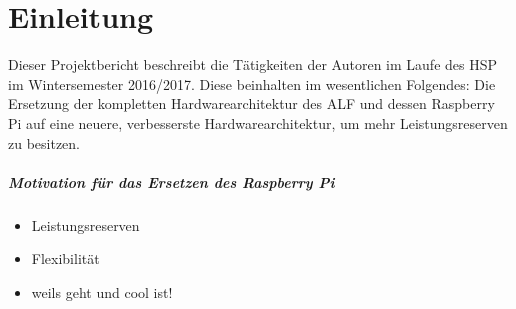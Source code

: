 \chapter{Einleitung}
Dieser Projektbericht beschreibt die Tätigkeiten der Autoren im Laufe des 
\ac{HSP} im Wintersemester 2016/2017. Diese beinhalten im wesentlichen 
Folgendes:
Die Ersetzung der kompletten Hardwarearchitektur des ALF und dessen Raspberry Pi 
auf eine neuere, verbesserste Hardwarearchitektur, um mehr Leistungsreserven zu 
besitzen.

\paragraph{Motivation für das Ersetzen des Raspberry Pi} 
\begin{itemize}
 \item Leistungsreserven
 \item Flexibilität
 \item weils geht und cool ist! 
\end{itemize}

